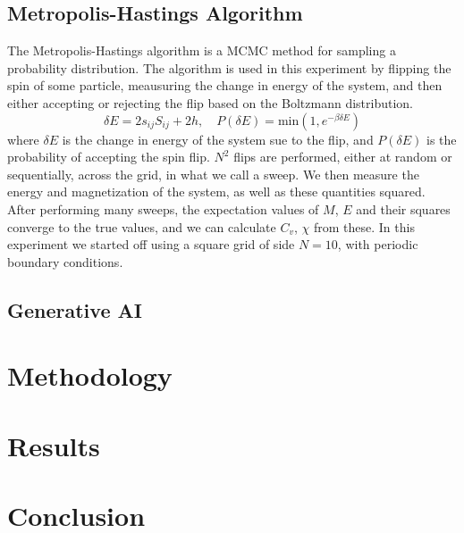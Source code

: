 \documentclass{article}
\theoremstyle{definition}
\theoremstyle{remark}
\begin{document}
\subsection{Metropolis-Hastings Algorithm}
The Metropolis-Hastings algorithm is a MCMC method for sampling a probability distribution. The algorithm is used in this experiment by flipping the spin of some particle, meausuring the change in energy of the system, and then either accepting or rejecting the flip based on the Boltzmann distribution\cite{doi:https://doi.org/10.1002/9783527618835.ch12}.
\begin{equation}
    \delta E = 2s_{ij}S_{ij} + 2h, \quad P(\delta E) = \mathrm{min}(1, e^{-\beta\delta E})
\end{equation}
where $\delta E$ is the change in energy of the system sue to the flip, and $P(\delta E)$ is the probability of accepting the spin flip. $N^2$ flips are performed, either at random or sequentially, across the grid, in what we call a sweep. We then measure the energy and magnetization of the system, as well as these quantities squared. After performing many sweeps, the expectation values of $M$, $E$ and their squares converge to the true values, and we can calculate $C_v$, $\chi$ from these. In this experiment we started off using a square grid of side $N=10$, with periodic boundary conditions.\\
\subsection{Generative AI}

\section{Methodology}

\section{Results}

\section{Conclusion}



\end{document}
